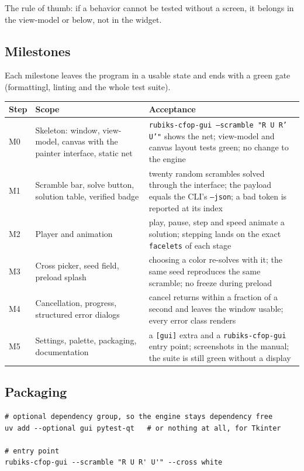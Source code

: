 The rule of thumb: if a behavior cannot be tested without a screen, it belongs in
the view-model or below, not in the widget.

\subsection{Milestones}

Each milestone leaves the program in a usable state and ends with a green gate
(formattingl, linting and the whole test suite).

\begin{longtable}{@{}p{1.5cm}p{5.4cm}p{7.2cm}@{}}
\toprule
Step & Scope & Acceptance \\
\midrule
\endhead
M0 & Skeleton: window, view-model, canvas with the painter interface, static net &
\texttt{rubiks-cfop-gui --scramble "R U R' U'"} shows the net; view-model and canvas
layout tests green; no change to the engine \\
M1 & Scramble bar, solve button, solution table, verified badge & twenty random
scrambles solved through the interface; the payload equals the CLI's
\texttt{--json}; a bad token is reported at its index \\
M2 & Player and animation & play, pause, step and speed animate a solution;
stepping lands on the exact \texttt{facelets} of each stage \\
M3 & Cross picker, seed field, preload splash & choosing a color re-solves with
it; the same seed reproduces the same scramble; no freeze during preload \\
M4 & Cancellation, progress, structured error dialogs & cancel returns within a
fraction of a second and leaves the window usable; every error class renders \\
M5 & Settings, palette, packaging, documentation & a \texttt{[gui]} extra and a
\texttt{rubiks-cfop-gui} entry point; screenshots in the manual; the suite is still
green without a display \\
\bottomrule
\end{longtable}

\subsection{Packaging}

\begin{lstlisting}[style=shell]
# optional dependency group, so the engine stays dependency free
uv add --optional gui pytest-qt   # or nothing at all, for Tkinter

# entry point
rubiks-cfop-gui --scramble "R U R' U'" --cross white
\end{lstlisting}

